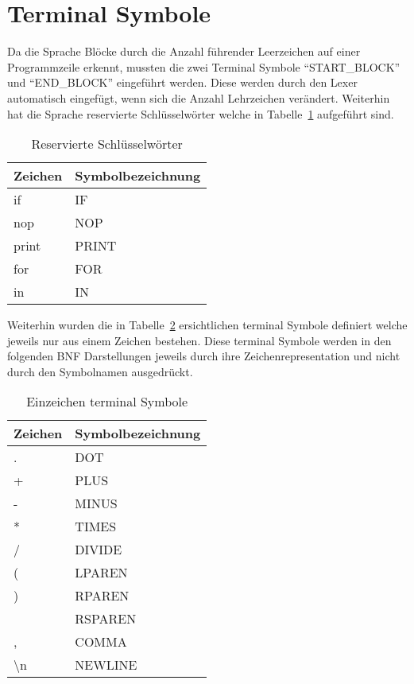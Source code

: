 \section{Terminal Symbole}
\label{sec:terminal_symbole}
Da die Sprache Blöcke durch die Anzahl führender Leerzeichen auf einer Programmzeile erkennt, mussten die zwei Terminal Symbole ``START\_BLOCK'' und ``END\_BLOCK'' eingeführt werden. Diese werden durch den Lexer automatisch eingefügt, wenn sich die Anzahl Lehrzeichen verändert. Weiterhin hat die Sprache reservierte Schlüsselwörter welche in Tabelle~\ref{tab:reserved_keywords} aufgeführt sind.

\begin{table}[h!]
  \centering
  \begin{tabular}{ll}
  \toprule
    Zeichen & Symbolbezeichnung\\
  \midrule
    if & IF \\
  \hline
    nop & NOP \\
  \hline
    print & PRINT \\
  \hline
    for & FOR \\
  \hline
    in & IN \\
  \bottomrule
  \end{tabular}
  \caption{Reservierte Schlüsselwörter}
  \label{tab:reserved_keywords}
\end{table}

Weiterhin wurden die in Tabelle~\ref{tab:single_char_terminals} ersichtlichen terminal Symbole definiert welche jeweils nur aus einem Zeichen bestehen.
Diese terminal Symbole werden in den folgenden BNF Darstellungen jeweils durch ihre Zeichenrepresentation und nicht durch den Symbolnamen ausgedrückt. 

\begin{table}[h!]
  \centering
  \begin{tabular}{ll}
  \toprule
    Zeichen & Symbolbezeichnung\\
  \midrule
    . & DOT \\
  \hline
    + & PLUS \\
  \hline
    - & MINUS \\
  \hline
    * & TIMES \\
  \hline
    / & DIVIDE \\
  \hline
    ( & LPAREN \\
  \hline
    ) & RPAREN \\
  \hline
    [ & LSPAREN \\
  \hline
    ] & RSPAREN \\
  \hline
    , & COMMA \\
  \hline
    \textbackslash n & NEWLINE \\
  \bottomrule
  \end{tabular}
  \caption{Einzeichen terminal Symbole}
  \label{tab:single_char_terminals}
\end{table}

